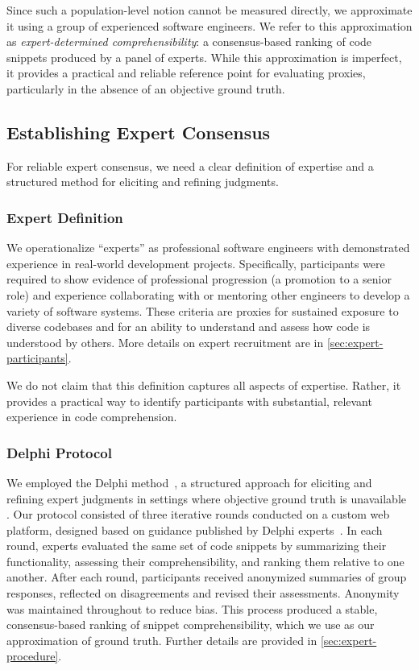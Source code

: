 Since such a population-level notion cannot be measured directly, we
approximate it using a group of experienced software engineers. We
refer to this approximation as \textit{expert-determined comprehensibility}: a
consensus-based ranking of code snippets produced by a panel of
experts. While this approximation is imperfect, it provides a
practical and reliable reference point for evaluating proxies,
particularly in the absence of an objective ground truth.

\subsection{Establishing Expert Consensus}
\label{sec:delphi}

For reliable expert consensus, we need a clear definition of expertise and a structured method for eliciting and refining judgments.

\subsubsection{Expert Definition}
We operationalize ``experts'' as professional software engineers with
demonstrated experience in real-world development
projects. Specifically, participants were required to show evidence of
professional progression (\eg a promotion to a senior role)
and experience collaborating with or mentoring other engineers to
develop a variety of software systems. These criteria are proxies
for sustained exposure to diverse codebases and for an ability to
understand and assess how code is understood by others. More details
on expert recruitment are in \cref{sec:expert-participants}.

We do not claim that this definition captures all aspects of
expertise. Rather, it provides a practical way to identify
participants with substantial, relevant experience in code
comprehension.

\subsubsection{Delphi Protocol}

We employed the Delphi method~\cite{delphi,delphiOriginal}, a structured approach for eliciting and refining expert judgments in settings where objective ground truth is unavailable \cite{m1,m2,m3,m4,g1,g2,e1,e2,o1,o2}. 
Our protocol consisted of three iterative rounds conducted on a custom
web platform, designed based on guidance published by Delphi experts~\cite {randManual}.
In each round, experts evaluated the same set of code
snippets by summarizing their functionality, assessing their
comprehensibility, and ranking them relative to one another. After
each round, participants received anonymized summaries of group
responses, reflected on disagreements and revised their
assessments. Anonymity was maintained throughout to reduce
bias. This process produced a stable, consensus-based ranking of
snippet comprehensibility, which we use as our approximation of ground
truth. Further details are provided in \cref{sec:expert-procedure}.

